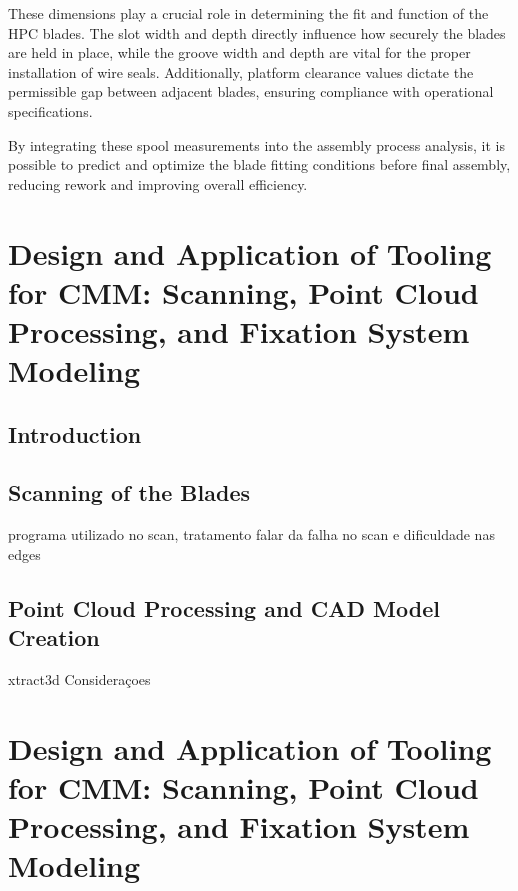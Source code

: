 These dimensions play a crucial role in determining the fit and function of the HPC blades. The slot width and depth directly influence how securely the blades are held in place, while the groove width and depth are vital for the proper installation of wire seals. Additionally, platform clearance values dictate the permissible gap between adjacent blades, ensuring compliance with operational specifications.

By integrating these spool measurements into the assembly process analysis, it is possible to predict and optimize the blade fitting conditions before final assembly, reducing rework and improving overall efficiency.



\chapter{Design and Application of Tooling for CMM: Scanning, Point Cloud Processing, and Fixation System Modeling}
\label{cha:digi}

\section{Introduction}
\label{sec:intro2}


\section{Scanning of the Blades}
\label{sec:scan}

programa utilizado no scan, tratamento 
falar da falha no scan e dificuldade nas edges

\section{Point Cloud Processing and CAD Model Creation}
\label{sec:cad}

xtract3d 
Consideraçoes


\chapter{Design and Application of Tooling for CMM: Scanning, Point Cloud Processing, and Fixation System Modeling}
\label{cha:dig}










